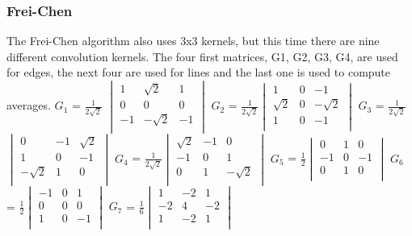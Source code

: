 \documentclass[12pt]{article}
\begin{document}
\subsubsection{Frei-Chen}
 The Frei-Chen algorithm also uses 3x3 kernels, but this time there are nine different convolution kernels. The four first matrices, G1, G2, G3, G4, are used for edges, the next four are used for lines and the last one is used to compute averages. 
\newline
\newline
 $G_1$ = $\frac{1}{2\sqrt2}$ $\begin{vmatrix}
        1 & \sqrt2 & 1\\
        0 & 0 & 0\\
        -1 & -\sqrt2 & -1\\
\end{vmatrix}$\hspace{5mm}
$G_2$ = $\frac{1}{2\sqrt2}$$\begin{vmatrix}
        1 & 0 & -1\\
        \sqrt2 & 0 & -\sqrt2\\
        1 & 0 & -1\\
\end{vmatrix}$\hspace{5mm}
$G_3$ = $\frac{1}{2\sqrt2}$$\begin{vmatrix}
        0 & -1 & \sqrt2\\
        1 & 0 & -1\\
        -\sqrt2 & 1 & 0\\
\end{vmatrix}$\hspace{5mm}
\newline
$G_4$ = $\frac{1}{2\sqrt2}$$\begin{vmatrix}
        \sqrt2 & -1 & 0\\
        -1 & 0 & 1\\
        0 & 1 & -\sqrt2\\
\end{vmatrix}$\hspace{5mm}
$G_5$ = $\frac{1}{2}$$\begin{vmatrix}
        0 & 1 & 0\\
        -1 & 0 & -1\\
        0 & 1 & 0\\
\end{vmatrix}$\hspace{10mm}
$G_6$ = $\frac{1}{2}$$\begin{vmatrix}
        -1 & 0 & 1\\
        0 & 0 & 0\\
        1 & 0 & -1\\
\end{vmatrix}$\hspace{5mm}
\newline
$G_7$ = $\frac{1}{6}$$\begin{vmatrix}
        1 & -2 & 1\\
        -2 & 4 & -2\\
        1 & -2 & 1\\
\end{vmatrix}$\hspace{13mm}
\end{document}
